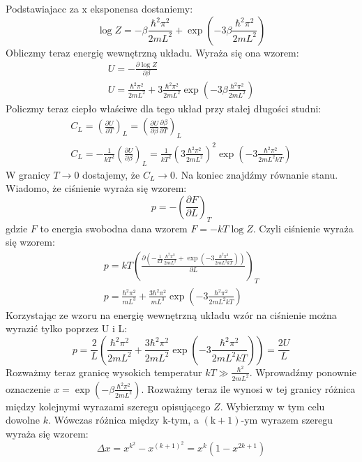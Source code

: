 \documentclass[12pt,a4paper]{article}
\begin{document}
Podstawiajacc za $\mathrm{x}$ eksponensa dostaniemy:
$$
\log Z=-\beta \frac{\hbar^{2} \pi^{2}}{2 m L^{2}}+\exp \left(-3 \beta \frac{\hbar^{2} \pi^{2}}{2 m L^{2}}\right)
$$
Obliczmy teraz energię wewnętrzną układu. Wyraża się ona wzorem:
$$
\begin{gathered}
U=-\frac{\partial \log Z}{\partial \beta} \\
U=\frac{\hbar^{2} \pi^{2}}{2 m L^{2}}+3 \frac{\hbar^{2} \pi^{2}}{2 m L^{2}} \exp \left(-3 \beta \frac{\hbar^{2} \pi^{2}}{2 m L^{2}}\right)
\end{gathered}
$$
Policzmy teraz ciepło właściwe dla tego układ przy stałej długości studni:
$$
\begin{gathered}
C_{L}=\left(\frac{\partial U}{\partial T}\right)_{L}=\left(\frac{\partial U}{\partial \beta} \frac{\partial \beta}{\partial T}\right)_{L} \\
C_{L}=-\frac{1}{k T^{2}}\left(\frac{\partial U}{\partial \beta}\right)_{L}=\frac{1}{k T^{2}}\left(3 \frac{\hbar^{2} \pi^{2}}{2 m L^{2}}\right)^{2} \exp \left(-3 \frac{\hbar^{2} \pi^{2}}{2 m L^{2} k T}\right)
\end{gathered}
$$
W granicy $T \rightarrow 0$ dostajemy, że $C_{L} \rightarrow 0$. Na koniec znajdźmy równanie stanu. Wiadomo, że ciśnienie wyraża się wzorem:
$$
p=-\left(\frac{\partial F}{\partial L}\right)_{T}
$$
gdzie $F$ to energia swobodna dana wzorem $F=-k T \log Z$. Czyli ciśnienie wyraża się wzorem:
$$
\begin{gathered}
p=k T\left(\frac{\partial\left(-\frac{1}{k T} \frac{\hbar^{2} \pi^{2}}{2 m L^{2}}+\exp \left(-3 \frac{\hbar^{2} \pi^{2}}{2 m L^{2} k T}\right)\right)}{\partial L}\right)_{T} \\
p=\frac{\hbar^{2} \pi^{2}}{m L^{3}}+\frac{3 \hbar^{2} \pi^{2}}{m L^{3}} \exp \left(-3 \frac{\hbar^{2} \pi^{2}}{2 m L^{2} k T}\right)
\end{gathered}
$$
Korzystając ze wzoru na energię wewnętrzną układu wzór na ciśnienie można wyrazić tylko poprzez U i L:
$$
p=\frac{2}{L}\left(\frac{\hbar^{2} \pi^{2}}{2 m L^{2}}+\frac{3 \hbar^{2} \pi^{2}}{2 m L^{2}} \exp \left(-3 \frac{\hbar^{2} \pi^{2}}{2 m L^{2} k T}\right)\right)=\frac{2 U}{L}
$$
Rozważmy teraz granicę wysokich temperatur $k T \gg \frac{\hbar^{2}}{2 m L^{2}}$. Wprowadźmy ponownie oznaczenie $x=\exp \left(-\beta \frac{\hbar^{2} \pi^{2}}{2 m L^{2}}\right)$. Rozważmy teraz ile wynosi w tej granicy różnica między kolejnymi wyrazami szeregu opisującego $Z$. Wybierzmy w tym celu dowolne $k$. Wówczas różnica między $\mathrm{k}$-tym, a $(\mathrm{k}+1)$-ym wyrazem szeregu wyraża się wzorem:
$$
\Delta x=x^{k^{2}}-x^{(k+1)^{2}}=x^{k}\left(1-x^{2 k+1}\right)
$$
\end{document}
